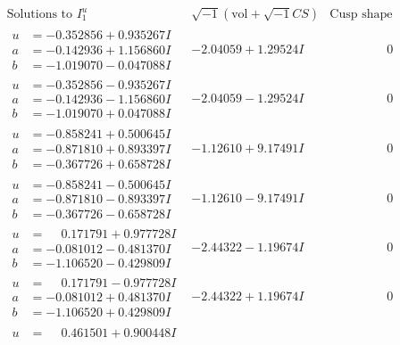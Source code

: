 \documentclass[1p]{elsarticle_modified}
\theoremstyle{definition}
\newcommand{\I}{\sqrt{-1}}
\begin{document}
$$\begin{array}{c|c|c}  
\text{Solutions to }I^u_{1}& \I (\text{vol} + \sqrt{-1}CS) & \text{Cusp shape}\\
 \hline 
\begin{aligned}
u &= -0.352856 + 0.935267 I \\
a &= -0.142936 + 1.156860 I \\
b &= -1.019070 - 0.047088 I\end{aligned}
 & -2.04059 + 1.29524 I & \phantom{-0.000000 } 0 \\ \hline\begin{aligned}
u &= -0.352856 - 0.935267 I \\
a &= -0.142936 - 1.156860 I \\
b &= -1.019070 + 0.047088 I\end{aligned}
 & -2.04059 - 1.29524 I & \phantom{-0.000000 } 0 \\ \hline\begin{aligned}
u &= -0.858241 + 0.500645 I \\
a &= -0.871810 + 0.893397 I \\
b &= -0.367726 + 0.658728 I\end{aligned}
 & -1.12610 + 9.17491 I & \phantom{-0.000000 } 0 \\ \hline\begin{aligned}
u &= -0.858241 - 0.500645 I \\
a &= -0.871810 - 0.893397 I \\
b &= -0.367726 - 0.658728 I\end{aligned}
 & -1.12610 - 9.17491 I & \phantom{-0.000000 } 0 \\ \hline\begin{aligned}
u &= \phantom{-}0.171791 + 0.977728 I \\
a &= -0.081012 - 0.481370 I \\
b &= -1.106520 - 0.429809 I\end{aligned}
 & -2.44322 - 1.19674 I & \phantom{-0.000000 } 0 \\ \hline\begin{aligned}
u &= \phantom{-}0.171791 - 0.977728 I \\
a &= -0.081012 + 0.481370 I \\
b &= -1.106520 + 0.429809 I\end{aligned}
 & -2.44322 + 1.19674 I & \phantom{-0.000000 } 0 \\ \hline\begin{aligned}
u &= \phantom{-}0.461501 + 0.900448 I \\

\end{aligned}
\end{array}$$
\end{document}
